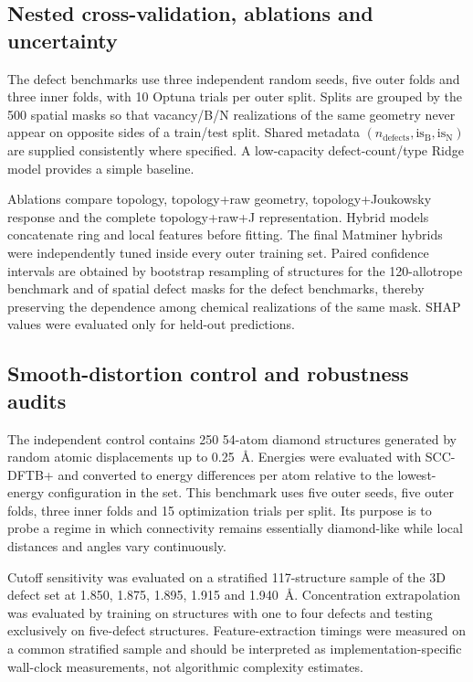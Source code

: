 \documentclass[twoside,twocolumn,9pt]{article}
\begin{document}
\subsection*{Nested cross-validation, ablations and uncertainty}

The defect benchmarks use three independent random seeds, five outer folds and three inner folds, with 10 Optuna trials per outer split. Splits are grouped by the 500 spatial masks so that vacancy/B/N realizations of the same geometry never appear on opposite sides of a train/test split. Shared metadata \((n_{\mathrm{defects}},\mathrm{is_B},\mathrm{is_N})\) are supplied consistently where specified. A low-capacity defect-count/type Ridge model provides a simple baseline.

Ablations compare topology, topology+raw geometry, topology+Joukowsky response and the complete topology+raw+J representation. Hybrid models concatenate ring and local features before fitting. The final Matminer hybrids were independently tuned inside every outer training set. Paired confidence intervals are obtained by bootstrap resampling of structures for the 120-allotrope benchmark and of spatial defect masks for the defect benchmarks, thereby preserving the dependence among chemical realizations of the same mask. SHAP values \cite{Lundberg2017} were evaluated only for held-out predictions.

\subsection*{Smooth-distortion control and robustness audits}

The independent control contains 250 54-atom diamond structures generated by random atomic displacements up to 0.25~\AA. Energies were evaluated with SCC-DFTB+ \cite{Hourahine2020} and converted to energy differences per atom relative to the lowest-energy configuration in the set. This benchmark uses five outer seeds, five outer folds, three inner folds and 15 optimization trials per split. Its purpose is to probe a regime in which connectivity remains essentially diamond-like while local distances and angles vary continuously.

Cutoff sensitivity was evaluated on a stratified 117-structure sample of the 3D defect set at 1.850, 1.875, 1.895, 1.915 and 1.940~\AA. Concentration extrapolation was evaluated by training on structures with one to four defects and testing exclusively on five-defect structures. Feature-extraction timings were measured on a common stratified sample and should be interpreted as implementation-specific wall-clock measurements, not algorithmic complexity estimates.
\end{document}
